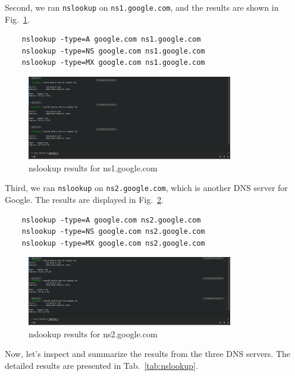 \documentclass{cshwk}
\begin{document}
Second, we ran \texttt{nslookup} on \texttt{ns1.google.com}, and the results are shown in Fig.~\ref{fig:nslookup-google}.


\begin{lstlisting}
    nslookup -type=A google.com ns1.google.com
    nslookup -type=NS google.com ns1.google.com
    nslookup -type=MX google.com ns1.google.com
\end{lstlisting}

\begin{figure}[htbp]
    \centering
    \includegraphics[width=0.8\textwidth]{hw2-1-4.png}
    \caption{nslookup results for ns1.google.com}
    \label{fig:nslookup-google}
\end{figure}

Third, we ran \texttt{nslookup} on \texttt{ns2.google.com}, which is another DNS server for Google. The results are displayed in Fig.~\ref{fig:nslookup-facebook}.


\begin{lstlisting}
    nslookup -type=A google.com ns2.google.com
    nslookup -type=NS google.com ns2.google.com
    nslookup -type=MX google.com ns2.google.com
\end{lstlisting}

\begin{figure}[htbp]
    \centering
    \includegraphics[width=0.8\textwidth]{hw2-1-5.png}
    \caption{nslookup results for ns2.google.com}
    \label{fig:nslookup-facebook}
\end{figure}

Now, let's inspect and summarize the results from the three DNS servers. The detailed results are presented in Tab.~\ref{tab:nslookup}.
\end{document}
